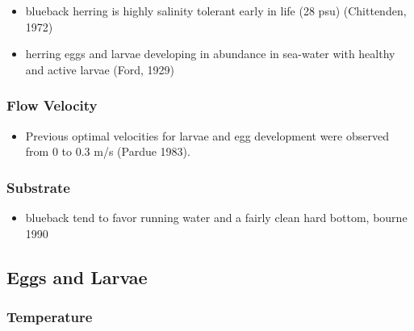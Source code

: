 \documentclass[
]{book}
\providecommand{\tightlist}{%
  \setlength{\itemsep}{0pt}\setlength{\parskip}{0pt}}
\begin{document}
\begin{itemize}
\tightlist
\item
  blueback herring is highly salinity tolerant early in life (28 psu) (Chittenden, 1972)
\item
  herring eggs and larvae developing in abundance in sea-water with healthy and active larvae (Ford, 1929)
\end{itemize}

\hypertarget{flow-velocity-4}{%
\subsubsection{Flow Velocity}\label{flow-velocity-4}}

\begin{itemize}
\tightlist
\item
  Previous optimal velocities for larvae and egg development were observed from 0 to 0.3 m/s (Pardue 1983).
\end{itemize}

\hypertarget{substrate-4}{%
\subsubsection{Substrate}\label{substrate-4}}

\begin{itemize}
\tightlist
\item
  blueback tend to favor running water and a fairly clean hard bottom, bourne 1990
\end{itemize}

\hypertarget{eggs-and-larvae}{%
\subsection{Eggs and Larvae}\label{eggs-and-larvae}}

\hypertarget{temperature-5}{%
\subsubsection{Temperature}\label{temperature-5}}
\end{document}
